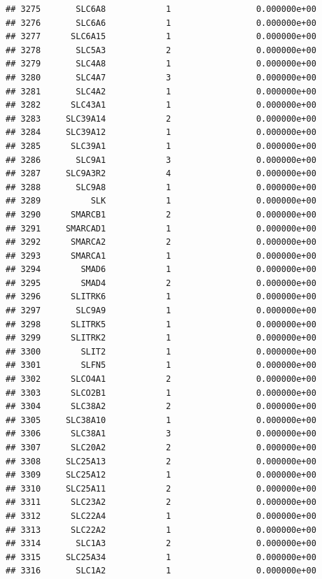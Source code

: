 \documentclass[
]{article}
\begin{document}
\begin{verbatim}
## 3275       SLC6A8            1                 0.000000e+00
## 3276       SLC6A6            1                 0.000000e+00
## 3277      SLC6A15            1                 0.000000e+00
## 3278       SLC5A3            2                 0.000000e+00
## 3279       SLC4A8            1                 0.000000e+00
## 3280       SLC4A7            3                 0.000000e+00
## 3281       SLC4A2            1                 0.000000e+00
## 3282      SLC43A1            1                 0.000000e+00
## 3283     SLC39A14            2                 0.000000e+00
## 3284     SLC39A12            1                 0.000000e+00
## 3285      SLC39A1            1                 0.000000e+00
## 3286       SLC9A1            3                 0.000000e+00
## 3287     SLC9A3R2            4                 0.000000e+00
## 3288       SLC9A8            1                 0.000000e+00
## 3289          SLK            1                 0.000000e+00
## 3290      SMARCB1            2                 0.000000e+00
## 3291     SMARCAD1            1                 0.000000e+00
## 3292      SMARCA2            2                 0.000000e+00
## 3293      SMARCA1            1                 0.000000e+00
## 3294        SMAD6            1                 0.000000e+00
## 3295        SMAD4            2                 0.000000e+00
## 3296      SLITRK6            1                 0.000000e+00
## 3297       SLC9A9            1                 0.000000e+00
## 3298      SLITRK5            1                 0.000000e+00
## 3299      SLITRK2            1                 0.000000e+00
## 3300        SLIT2            1                 0.000000e+00
## 3301        SLFN5            1                 0.000000e+00
## 3302      SLCO4A1            2                 0.000000e+00
## 3303      SLCO2B1            1                 0.000000e+00
## 3304      SLC38A2            2                 0.000000e+00
## 3305     SLC38A10            1                 0.000000e+00
## 3306      SLC38A1            3                 0.000000e+00
## 3307      SLC20A2            2                 0.000000e+00
## 3308     SLC25A13            2                 0.000000e+00
## 3309     SLC25A12            1                 0.000000e+00
## 3310     SLC25A11            2                 0.000000e+00
## 3311      SLC23A2            2                 0.000000e+00
## 3312      SLC22A4            1                 0.000000e+00
## 3313      SLC22A2            1                 0.000000e+00
## 3314       SLC1A3            2                 0.000000e+00
## 3315     SLC25A34            1                 0.000000e+00
## 3316       SLC1A2            1                 0.000000e+00

\end{verbatim}
\end{document}
